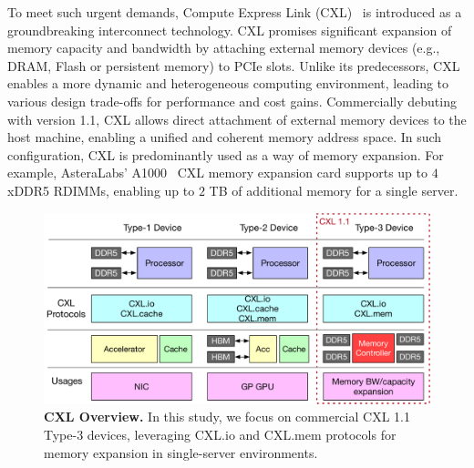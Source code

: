 To meet such urgent demands, Compute Express Link (CXL)~\cite{cxl, cxl_azure, cxl-ssd, cxlcentric} is introduced as a groundbreaking interconnect technology. 
CXL promises significant expansion of memory capacity and bandwidth by attaching external memory devices (e.g., DRAM, Flash or persistent memory) to PCIe slots.  
Unlike its predecessors, CXL enables a more dynamic and heterogeneous computing environment, leading to various design trade-offs for performance and cost gains. Commercially debuting with version 1.1, CXL allows direct attachment of external memory devices to the host machine, enabling a unified and coherent memory address space. In such configuration, CXL is predominantly used as a way of memory expansion.
For example, AsteraLabs' A1000~\cite{A1000} CXL memory expansion card supports up to $4$xDDR5 RDIMMs, enabling up to $2$ TB of additional memory for a single server.

\begin{figure}[t]
    \centering
      \includegraphics[width=\columnwidth]{fig/cxl/cxl.pdf}
      \vspace{-1.5em}
      \caption{\textbf{CXL Overview.} In this study, we focus on commercial CXL 1.1 Type-3 devices, leveraging CXL.io and CXL.mem protocols for memory expansion in single-server environments.} 
    \label{fig:cxl1.1} \vspace{-1.5em}
    \end{figure}

